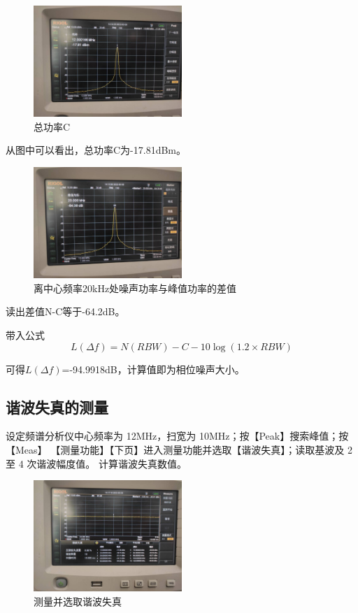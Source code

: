 \documentclass{../source/Experiment}
\begin{document}
\begin{figure}[H]
    \centering
    \includegraphics[width = 0.5\textwidth]{lab3/1.jpg}
    \caption{总功率C}
\end{figure}
从图中可以看出，总功率C为-17.81dBm。
\begin{figure}[H]
    \centering
    \includegraphics[width = 0.5\textwidth]{lab3/2.jpg}
    \caption{离中心频率20kHz处噪声功率与峰值功率的差值}
\end{figure}
读出差值N-C等于-64.2dB。

带入公式$$L(\Delta f)=N(R B W)-C-10 \log (1.2 \times R B W)$$

可得$L(\Delta f)$=-94.9918dB，计算值即为相位噪声大小。

\subsection{谐波失真的测量}
设定频谱分析仪中心频率为 12MHz，扫宽为 10MHz；按【Peak】搜索峰值；按【Meas】
【测量功能】【下页】进入测量功能并选取【谐波失真】；读取基波及 2 至 4 次谐波幅度值。
计算谐波失真数值。
\begin{figure}[H]
    \centering
    \includegraphics[width = 0.5\textwidth]{lab3/3.jpg}
    \caption{测量并选取谐波失真}
\end{figure}
\end{document}

